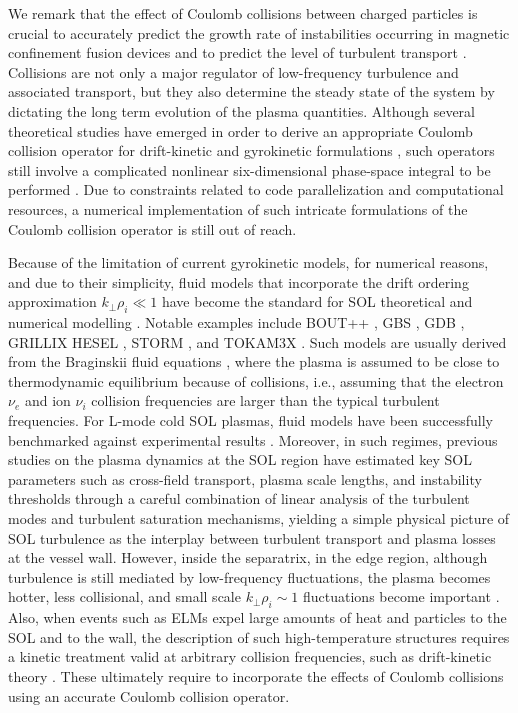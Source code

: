 We remark that the effect of Coulomb collisions between charged particles is crucial to accurately predict the growth rate of instabilities occurring in magnetic confinement fusion devices and to predict the level of turbulent transport \citep{Barnes2009}.
%
Collisions are not only a major regulator of low-frequency turbulence and associated transport, but they also determine the steady state of the system by dictating the long term evolution of the plasma quantities.
%
Although several theoretical studies have emerged in order to derive an appropriate Coulomb collision operator for drift-kinetic and gyrokinetic formulations \citep{Brizard2004,Sugama2015,Burby2015}, such operators still involve a complicated nonlinear six-dimensional phase-space integral to be performed \citep{Hirvijoki2017}.
%
Due to constraints related to code parallelization and computational resources, a numerical implementation of such intricate formulations of the Coulomb collision operator is still out of reach.

Because of the limitation of current gyrokinetic models, for numerical reasons, and due to their simplicity, fluid models that incorporate the drift ordering approximation $k_\perp \rho_i \ll 1$ have become the standard for SOL theoretical and numerical modelling \citep{Zeiler1997,Ribeiro2008a}.
%
Notable examples include BOUT++ \citep{Dudson2009}, GBS \citep{Ricci2012a}, GDB \citep{Zhu2018}, GRILLIX \citep{Stegmeir2018} HESEL \citep{Nielsen2015}, STORM \citep{Easy2014}, and TOKAM3X \citep{Tamain2009}.
%
Such models are usually derived from the Braginskii fluid equations \citep{Braginskii1965}, where the plasma is assumed to be close to thermodynamic equilibrium because of collisions, i.e., assuming that the electron $\nu_e$ and ion $\nu_i$ collision frequencies are larger than the typical turbulent frequencies.
%
For L-mode cold SOL plasmas, fluid models have been successfully benchmarked against experimental results \citep{Riva2016,Militello2016}.
%
Moreover, in such regimes, previous studies on the plasma dynamics at the SOL region \citep{Ricci2013, Mosetto2015} have estimated key SOL parameters such as cross-field transport, plasma scale lengths, and instability thresholds through a careful combination of linear analysis of the turbulent modes and turbulent saturation mechanisms, yielding a simple physical picture of SOL turbulence as the interplay between turbulent transport and plasma losses at the vessel wall.
%
However, inside the separatrix, in the edge region, although turbulence is still mediated by low-frequency fluctuations, the plasma becomes hotter, less collisional, and small scale $k_\perp \rho_i \sim 1$ fluctuations become important \citep{Hahm2009}.
%
Also, when events such as ELMs expel large amounts of heat and particles to the SOL and to the wall, the description of such high-temperature structures requires a kinetic treatment valid at arbitrary collision frequencies, such as drift-kinetic theory \citep{Hazeltine2003}.
%
These ultimately require to incorporate the effects of Coulomb collisions using an accurate Coulomb collision operator.


